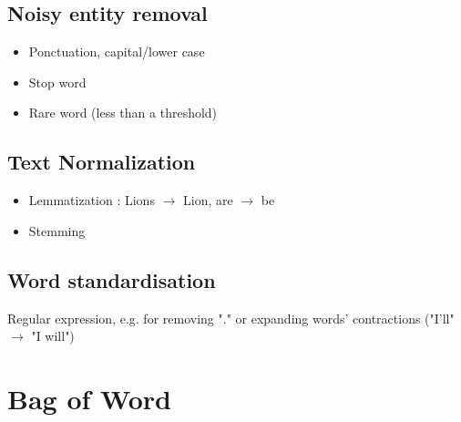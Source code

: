 \documentclass{article}
\theoremstyle{plain}%
\theoremstyle{definition}
\theoremstyle{remark}
\begin{document}
\subsection{Noisy entity removal}
\begin{itemize}
    \item Ponctuation, capital/lower case
    \item Stop word 
    \item Rare word (less than a threshold)
\end{itemize}

\subsection{Text Normalization}
\begin{itemize}
    \item Lemmatization : Lions $\rightarrow$ Lion, are $\rightarrow$ be
    \item Stemming
\end{itemize}

\subsection{Word standardisation}
Regular expression, e.g. for removing "." or expanding words’ contractions ("I'll" $\rightarrow$ "I will")


\section{Bag of Word}
\end{document}
